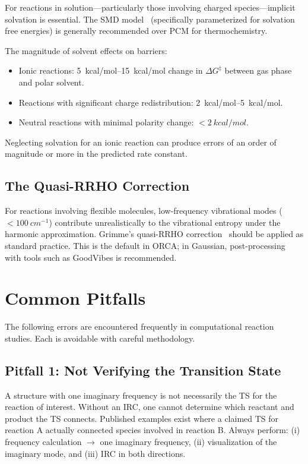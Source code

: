 \documentclass[11pt]{article}
\numberwithin{equation}{section}
\begin{document}
For reactions in solution---particularly those involving charged species---implicit solvation is essential. The SMD model~\cite{SMD2009} (specifically parameterized for solvation free energies) is generally recommended over PCM for thermochemistry.

The magnitude of solvent effects on barriers:
\begin{itemize}
\item Ionic reactions: \SIrange{5}{15}{kcal/mol} change in $\Delta G^\ddagger$ between gas phase and polar solvent.
\item Reactions with significant charge redistribution: \SIrange{2}{5}{kcal/mol}.
\item Neutral reactions with minimal polarity change: ${<}\SI{2}{kcal/mol}$.
\end{itemize}

Neglecting solvation for an ionic reaction can produce errors of an order of magnitude or more in the predicted rate constant.

\subsection{The Quasi-RRHO Correction}

For reactions involving flexible molecules, low-frequency vibrational modes ($<\!\SI{100}{cm^{-1}}$) contribute unrealistically to the vibrational entropy under the harmonic approximation. Grimme's quasi-RRHO correction~\cite{GrimmeQRRHO2012} should be applied as standard practice. This is the default in ORCA; in Gaussian, post-processing with tools such as GoodVibes is recommended.


\section{Common Pitfalls}
\label{sec:pitfalls}

The following errors are encountered frequently in computational reaction studies. Each is avoidable with careful methodology.

\subsection{Pitfall 1: Not Verifying the Transition State}

A structure with one imaginary frequency is not necessarily the TS for the reaction of interest. Without an IRC, one cannot determine which reactant and product the TS connects. Published examples exist where a claimed TS for reaction A actually connected species involved in reaction B. Always perform: (i) frequency calculation $\to$ one imaginary frequency, (ii) visualization of the imaginary mode, and (iii) IRC in both directions.
\end{document}
